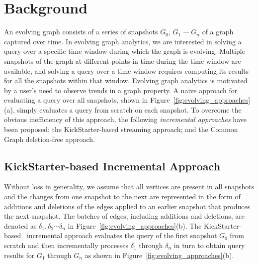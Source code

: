 \section{Background}

An evolving graph consists of a series of snapshots $G_0$, $G_1$ $\cdots$ $G_n$ of a graph captured over time. 
In evolving graph analytics, we are interested in solving a query over a specific time window during which the graph is evolving. Multiple snapshots of the graph at different points in time during the time window are available, and solving a query over a time window requires computing its results for all the snapshots within that window. Evolving graph analytics is motivated by a user's need to observe trends in a graph property. A naive approach for evaluating a query over all snapshots, shown in Figure~\ref{fig:evolving_approaches}(a), simply evaluates a query from scratch on each snapshot. To overcome  the obvious inefficiency of this approach, the following \emph{incremental approaches} have been proposed: the KickStarter-based  streaming approach; and the Common Graph deletion-free approach.

\subsection{KickStarter-based Incremental Approach}

Without loss in generality, we assume that all vertices are present in all snapshots and the changes from one snapshot to the next are represented in the form of additions and deletions of the edges applied to an earlier snapshot that produces the next snapshot. The batches of edges, including additions and deletions, are denoted as $\delta_1, \delta_2 \cdots \delta_n$ in Figure~\ref{fig:evolving_approaches}(b). The KickStarter-based~\cite{kickstarter} incremental approach evaluates the query of the first snapshot $G_0$ from scratch and then incrementally processes $\delta_1$ through $\delta_n$ in turn to obtain query results for $G_1$ through $G_n$ as shown in Figure~\ref{fig:evolving_approaches}(b).

